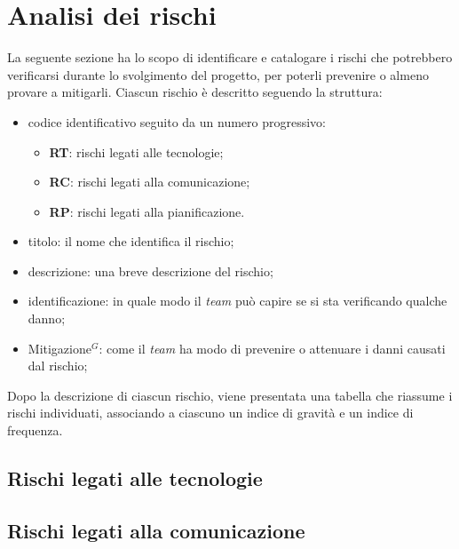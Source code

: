 \section{Analisi dei rischi}

La seguente sezione ha lo scopo di identificare e catalogare i rischi che
potrebbero verificarsi durante lo svolgimento del progetto, per poterli
prevenire o almeno provare a mitigarli.
Ciascun rischio è descritto seguendo la struttura:
\begin{itemize}
	\item codice identificativo seguito da un numero progressivo:
	      \begin{itemize}
		      \item \textbf{RT}: rischi legati alle tecnologie;
		      \item \textbf{RC}: rischi legati alla comunicazione;
		      \item \textbf{RP}: rischi legati alla pianificazione.
	      \end{itemize}

	\item titolo: il nome che identifica il rischio;

	\item descrizione: una breve descrizione del rischio;

	\item identificazione: in quale modo il \textit{team} può capire se si sta
	      verificando qualche danno;

	\item \gls{Mitigazione}$^G$: come il \textit{team} ha modo di prevenire o
	      attenuare i danni causati dal rischio;
\end{itemize}

Dopo la descrizione di ciascun rischio, viene presentata una tabella che
riassume i rischi individuati, associando a ciascuno un indice di gravità e un
indice di frequenza.

\subsection{Rischi legati alle tecnologie}




\subsection{Rischi legati alla comunicazione}




